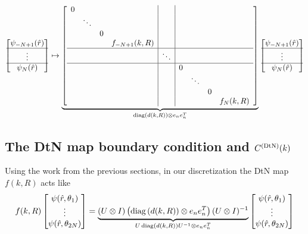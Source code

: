 \begin{align*}
 \begin{bmatrix}
  \psi_{-N+1}(\hat{r}) \\ \hline
  \vdots \\ \hline
  \psi_N(\hat{r})
 \end{bmatrix}
 \mapsto
 \underbrace{
 \left[
 \begin{array}{cccc|c|cccc}
  0 &        &   &               &        &   &        &   & \\ 
    & \ddots &   &               &        &   &        &   & \\ 
    &        & 0 &               &        &   &        &   & \\ 
    &        &   & f_{-N+1}(k,R) &        &   &        &   & \\ \hline
    &        &   &               & \ddots &   &        &   & \\ \hline
    &        &   &               &        & 0 &        &   & \\ 
    &        &   &               &        &   & \ddots &   & \\ 
    &        &   &               &        &   &        & 0 & \\ 
    &        &   &               &        &   &        &   & f_N(k,R)
 \end{array}
 \right]
 }_{\operatorname{diag}\left(d(k,R)\right) \otimes e_ne_n^T}
 \begin{bmatrix}
  \psi_{-N+1}(\hat{r}) \\ \hline
  \vdots \\ \hline
  \psi_N(\hat{r})
 \end{bmatrix}
\end{align*}

\subsection{The DtN map boundary condition and $C^{(\text{DtN})}(k)$}

Using the work from the previous sections, in our
discretization the DtN map $f(k,R)$ acts like
\begin{align*}
 f(k,R)
 \begin{bmatrix}
  \psi(\hat{r},\theta_1) \\ \vdots \\ \psi(\hat{r},\theta_{2N})
 \end{bmatrix}
 = 
 \underbrace{
 (U \otimes I)
 \left(\operatorname{diag}\left(d(k,R)\right) \otimes e_ne_n^T\right)(U \otimes I)^{-1}
 }_{U\operatorname{diag}\left(d(k,R)\right)U^{-1} \otimes e_ne_n^T}
 \begin{bmatrix}
  \psi(\hat{r},\theta_1) \\ \vdots \\ \psi(\hat{r},\theta_{2N})
 \end{bmatrix}
\end{align*}

